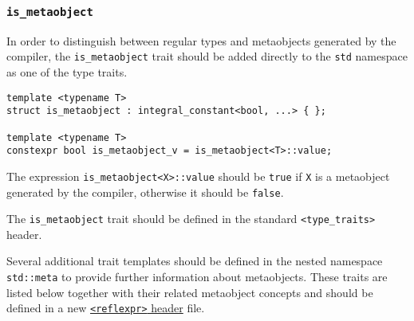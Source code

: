 \subsubsection{\texttt{is\_metaobject}}

In order to distinguish between regular types and metaobjects generated
by the compiler, the \texttt{is\_metaobject} trait should be added
directly to the \texttt{std} namespace as one of the type traits. 

\begin{verbatim}
template <typename T>
struct is_metaobject : integral_constant<bool, ...> { };

template <typename T>
constexpr bool is_metaobject_v = is_metaobject<T>::value;
\end{verbatim}

The expression \texttt{is\_metaobject<X>::value} should be \texttt{true}
if \texttt{X} is a metaobject generated by the compiler, otherwise it should
be \texttt{false}.

The \texttt{is\_metaobject} trait should be defined in the standard
\texttt{<type\_traits>} header.

Several additional trait templates should be defined in the nested namespace
\texttt{std::meta} to provide further information about metaobjects.
These traits are listed below together with their related metaobject concepts
and should be defined in a new
\hyperref[section-reflexpr-header]{\texttt{<reflexpr>} header} file.
